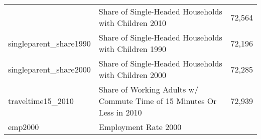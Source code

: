 \documentclass[]{book}
\begin{document}
\begin{longtable}[]{@{}lll@{}}
\begin{minipage}[t]{0.04\columnwidth}
\end{minipage} & \begin{minipage}[t]{0.04\columnwidth}\raggedright\strut
Share of Single-Headed Households with Children 2010\strut
\end{minipage} & \begin{minipage}[t]{0.04\columnwidth}\raggedright\strut
72,564\strut
\end{minipage}\tabularnewline
\begin{minipage}[t]{0.04\columnwidth}\raggedright\strut
singleparent\_share1990\strut
\end{minipage} & \begin{minipage}[t]{0.04\columnwidth}\raggedright\strut
Share of Single-Headed Households with Children 1990\strut
\end{minipage} & \begin{minipage}[t]{0.04\columnwidth}\raggedright\strut
72,196\strut
\end{minipage}\tabularnewline
\begin{minipage}[t]{0.04\columnwidth}\raggedright\strut
singleparent\_share2000\strut
\end{minipage} & \begin{minipage}[t]{0.04\columnwidth}\raggedright\strut
Share of Single-Headed Households with Children 2000\strut
\end{minipage} & \begin{minipage}[t]{0.04\columnwidth}\raggedright\strut
72,285\strut
\end{minipage}\tabularnewline
\begin{minipage}[t]{0.04\columnwidth}\raggedright\strut
traveltime15\_2010\strut
\end{minipage} & \begin{minipage}[t]{0.04\columnwidth}\raggedright\strut
Share of Working Adults w/ Commute Time of 15 Minutes Or Less in
2010\strut
\end{minipage} & \begin{minipage}[t]{0.04\columnwidth}\raggedright\strut
72,939\strut
\end{minipage}\tabularnewline
\begin{minipage}[t]{0.04\columnwidth}\raggedright\strut
emp2000\strut
\end{minipage} & \begin{minipage}[t]{0.04\columnwidth}\raggedright\strut
Employment Rate 2000\strut
\end{minipage} & \begin{minipage}[t]{0.04\columnwidth}\raggedright\strut

\end{minipage}
\end{longtable}
\end{document}
